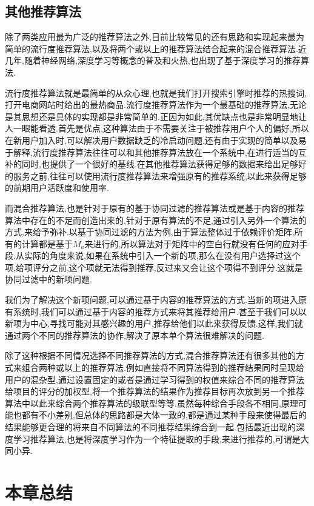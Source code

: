 \subsection{其他推荐算法}	

除了两类应用最为广泛的推荐算法之外,目前比较常见的还有思路和实现起来最为简单的流行度推荐算法,以及将两个或以上的推荐算法结合起来的混合推荐算法.近几年,随着神经网络,深度学习等概念的普及和火热,也出现了基于深度学习的推荐算法.

流行度推荐算法就是最简单的从众心理,也就是我们打开搜索引擎时推荐的热搜词,打开电商网站时给出的最热商品.流行度推荐算法作为一个最基础的推荐算法,无论是其思想还是具体的实现都是非常简单的.正因为如此,其优缺点也是非常明显地让人一眼能看透.首先是优点,这种算法由于不需要关注于被推荐用户个人的偏好,所以在新用户加入时,可以解决用户数据缺乏的冷启动问题.还有由于实现的简单以及易于解释,流行度推荐算法往往可以和其他推荐算法放在一个系统中,在进行适当的互补的同时,也提供了一个很好的基线.在其他推荐算法获得足够的数据来给出足够好的服务之前,往往可以使用流行度推荐算法来增强原有的推荐系统,以此来获得足够的前期用户活跃度和使用率.

而混合推荐算法,也是针对于原有的基于协同过滤的推荐算法或是基于内容的推荐算法中存在的不足而创造出来的.针对于原有算法的不足,通过引入另外一个算法的方式,来给予弥补.以基于协同过滤的方法为例,由于算法整体过于依赖评价矩阵,所有的计算都是基于$M_a$来进行的,所以算法对于矩阵中的空白行就没有任何的应对手段.从实际的角度来说,如果在系统中引入一个新的项,那么在没有用户选择过这个项,给项评分之前,这个项就无法得到推荐,反过来又会让这个项得不到评分.这就是协同过滤中的新项问题.

我们为了解决这个新项问题,可以通过基于内容的推荐算法的方式.当新的项进入原有系统时,我们可以通过基于内容的推荐方式来将其推荐给用户.甚至于我们可以以新项为中心,寻找可能对其感兴趣的用户,推荐给他们以此来获得反馈.这样,我们就通过两个不同的推荐算法的协作,解决了原本单个算法很难解决的问题.

除了这种根据不同情况选择不同推荐算法的方式,混合推荐算法还有很多其他的方式来组合两种或以上的推荐算法.例如直接将不同算法得到的推荐结果同时呈现给用户的混杂型,通过设置固定的或者是通过学习得到的权值来综合不同的推荐算法给项目的评分的加权型,将一个推荐算法的结果作为推荐目标再次放到另一个推荐算法中以此来综合两个推荐算法的级联型等等.虽然每种综合手段各不相同,原理可能也都有不小差别,但总体的思路都是大体一致的,都是通过某种手段来使得最后的结果能够更合理的将来自不同算法的不同推荐结果综合到一起.包括最近出现的深度学习推荐算法,也是将深度学习作为一个特征提取的手段,来进行推荐的,可谓是大同小异.


\section{本章总结}
\label{sec:sum2}

